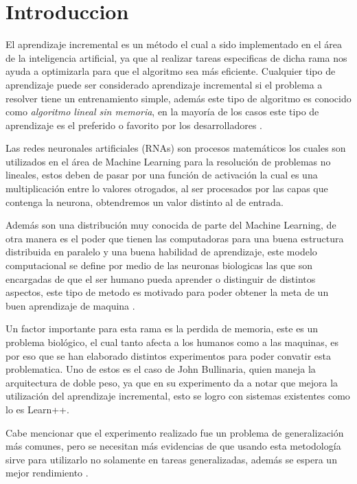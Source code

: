 \section{Introduccion}

El aprendizaje incremental es un método el cual a sido implementado en el área de la inteligencia artificial, ya que al realizar tareas especificas de dicha rama nos 
ayuda a optimizarla para que el algoritmo sea más eficiente.
Cualquier tipo de aprendizaje puede ser considerado aprendizaje incremental si el problema a resolver tiene un entrenamiento simple, adem\'as este tipo de algoritmo es conocido como \textit{algoritmo lineal sin memoria},
en la mayor\'ia de los casos este tipo de aprendizaje es el preferido o favorito por los desarrolladores \cite{GiraudCarrier2000}.

Las redes neuronales artificiales (RNAs) son procesos matem\'aticos los cuales son utilizados en el \'area de Machine Learning para 
la resoluci\'on de problemas no lineales, estos deben de pasar por una funci\'on de activaci\'on la cual es una multiplicaci\'on 
entre lo valores otrogados, al ser procesados por las capas que contenga la neurona, obtendremos un valor distinto al de entrada.

Adem\'as son una distribuci\'on muy conocida de parte del Machine Learning, de otra manera es el poder que tienen las computadoras para una buena estructura distribuida en paralelo y una buena habilidad de aprendizaje, 
este modelo computacional se define por medio de las neuronas biologicas las que son encargadas de que el ser humano pueda aprender o distinguir de distintos aspectos, este tipo de 
metodo es motivado para poder obtener la meta de un buen aprendizaje de maquina \cite{liu2015}.

Un factor importante para esta rama es la perdida de memoria, este es un problema biol\'ogico, el cual tanto afecta a los humanos como a las maquinas, es por eso que se han elaborado distintos
experimentos para poder convatir esta problematica.
Uno de  estos es el caso de John Bullinaria, quien maneja la arquitectura de doble peso, ya que en su experimento da a notar que mejora la utilizaci\'on del aprendizaje incremental, esto se logro 
con sistemas existentes como lo es Learn++.

Cabe mencionar que el experimento realizado fue un problema de generalizaci\'on m\'as comunes, pero se necesitan m\'as evidencias 
de que usando esta metodolog\'ia sirve para utilizarlo no solamente en tareas generalizadas, adem\'as se espera un mejor rendimiento \cite{Bullinaria2009}.  \\


